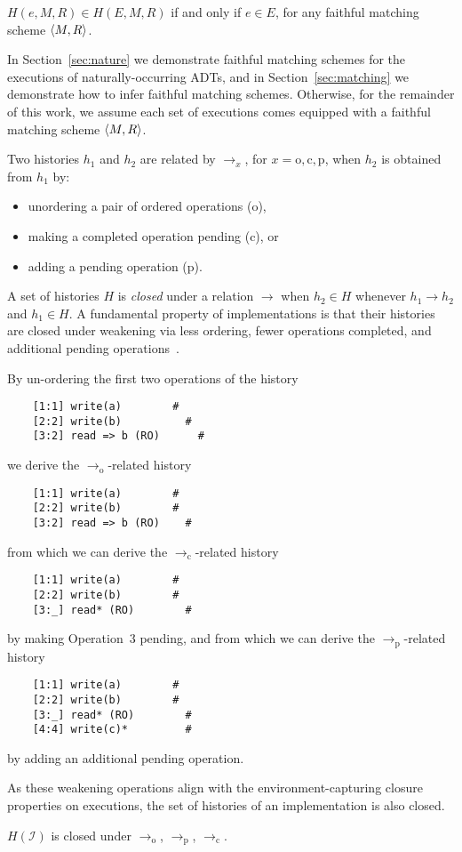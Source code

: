 \begin{lemma}

  $H(e,M,R) \in H(E,M,R)$ if and only if $e \in E$, for any faithful matching
  scheme ${\left\langle{M,R}\right\rangle}$.

\end{lemma}

In Section~\ref{sec:nature} we demonstrate faithful matching schemes for the
executions of naturally-occurring ADTs, and in Section~\ref{sec:matching} we
demonstrate how to infer faithful matching schemes. Otherwise, for the
remainder of this work, we assume each set of executions comes equipped with a
faithful matching scheme ${\left\langle{M,R}\right\rangle}$.

Two histories $h_1$ and $h_2$ are related by $\to_x$, for $x = \mathrm{o},
\mathrm{c}, \mathrm{p}$, when $h_2$ is obtained from $h_1$ by:
\begin{itemize}

  \item unordering a pair of ordered operations (o),

  \item making a completed operation pending (c), or

  \item adding a pending operation (p).

\end{itemize}
A set of histories $H$ is \emph{closed} under a relation $\to$ when $h_2 \in H$
whenever $h_1 \to h_2$ and $h_1 \in H$. A fundamental property of
implementations is that their histories are closed under weakening via less
ordering, fewer operations completed, and additional pending
operations~\cite{conf/popl/BouajjaniEEH15}.

\begin{example}

  By un-ordering the first two operations of the history
\begin{verbatim}
    [1:1] write(a)        #
    [2:2] write(b)          #
    [3:2] read => b (RO)      #
\end{verbatim}
  we derive the $\to_\mathrm{o}$-related history
\begin{verbatim}
    [1:1] write(a)        #
    [2:2] write(b)        #
    [3:2] read => b (RO)    #
\end{verbatim}
  from which we can derive the $\to_\mathrm{c}$-related history
\begin{verbatim}
    [1:1] write(a)        #
    [2:2] write(b)        #
    [3:_] read* (RO)        #
\end{verbatim}
  by making Operation~$3$ pending, and from which we can derive the
  $\to_\mathrm{p}$-related history
\begin{verbatim}
    [1:1] write(a)        #
    [2:2] write(b)        #
    [3:_] read* (RO)        #
    [4:4] write(c)*         #
\end{verbatim}
  by adding an additional pending operation.

\end{example}

As these weakening operations align with the environment-capturing closure
properties on executions, the set of histories of an implementation is also
closed.

\begin{lemma}

  $H(\mathcal{I})$ is closed under $\to_\mathrm{o}$, $\to_\mathrm{p}$,
  $\to_\mathrm{c}$.

\end{lemma}
